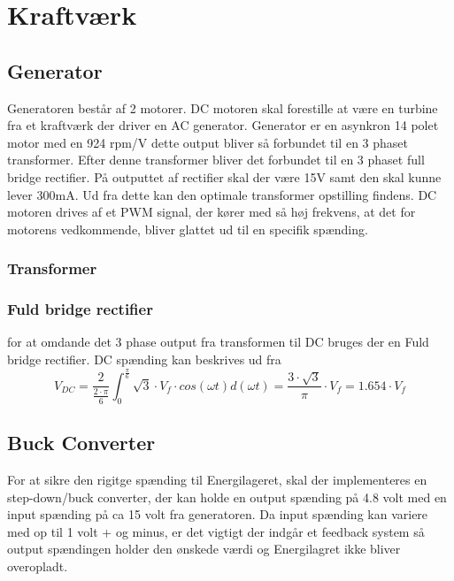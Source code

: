 \documentclass[../main.tex]{subfiles}
\begin{document}
\chapter{Kraftværk} \label{Chap:Kraftværk}

\section{Generator}
Generatoren består af 2 motorer. DC motoren skal forestille at være en turbine fra et kraftværk der driver en AC generator. Generator er en asynkron 14 polet motor med en 924 rpm/V dette output bliver så forbundet til en 3 phaset transformer. Efter denne transformer bliver det forbundet til en 3 phaset full bridge rectifier. På outputtet af rectifier skal der være 15V samt den skal kunne lever 300mA. Ud fra dette kan den optimale transformer opstilling findens. DC motoren drives af et PWM signal, der kører med så høj frekvens, at det for motorens vedkommende, bliver glattet ud til en specifik spænding.
\subsection{Transformer}
\subsection{Fuld bridge rectifier}
for at omdande det 3 phase output fra transformen til DC bruges der en Fuld bridge rectifier.
DC spænding kan beskrives ud fra 
$$ V_{DC} = \frac{2}{\frac{2 \cdot \pi}{6}}\int_{0}^{\frac{\pi}{6}}\sqrt{3}\cdot V_f \cdot cos(\omega t) d(\omega t) = \frac{3 \cdot \sqrt{3}}{\pi} \cdot V_f = 1.654 \cdot V_f $$





\section{Buck Converter}
For at sikre den rigitge spænding til Energilageret, skal der implementeres en step-down/buck converter, der kan holde en output spænding på 4.8 volt med en input spænding på ca 15 volt fra generatoren. Da input spænding kan variere med op til 1 volt + og minus, er det vigtigt der indgår et feedback system så output spændingen holder den ønskede værdi og Energilagret ikke bliver overopladt.
\end{document}
